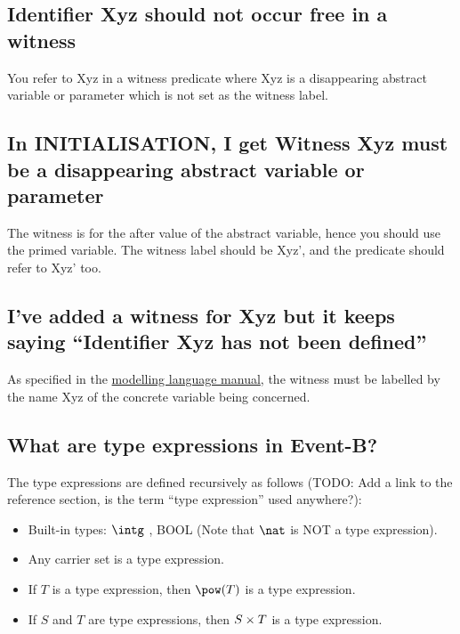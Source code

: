 \subsection{Identifier \textsf{Xyz} should not occur free in a witness}

You refer to \textsf{Xyz} in a witness predicate where \textsf{Xyz} is a disappearing abstract variable or parameter which is not set as the witness label. 

\subsection{In \textsf{INITIALISATION}, I get Witness \textsf{Xyz} must be a disappearing abstract variable or parameter}

The witness is for the after value of the abstract variable, hence you should use the primed variable. The witness label should be \textsf{Xyz'}, and the predicate should refer to \textsf{Xyz'} too. 

\subsection{I've added a witness for \textsf{Xyz} but it keeps saying ``Identifier \textsf{Xyz} has not been defined''}

As specified in the \href{http://wiki.event-b.org/index.php/Witnesses_(Modelling_Language)}{modelling language manual}, the witness must be labelled by the name \textsf{Xyz} of the concrete variable being concerned.

\subsection{What are type expressions in Event-B?}

The type expressions are defined recursively as follows (TODO: Add a link to the reference section, is the term ``type expression'' used anywhere?): 

\begin{itemize}
	\item Built-in types: $\intg$ , BOOL (Note that $\nat$ is NOT a type expression).
	\item Any carrier set is a type expression. 
	\item If $T$ is a type expression, then $\pow(T)$ is a type expression. 
	\item If $S$ and $T$ are type expressions, then $S\mathbin\times T$ is a type expression. 
\end{itemize} 

